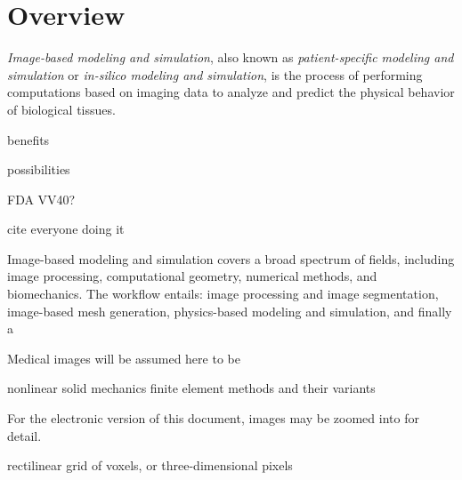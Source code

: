 \chapter{Overview}
%

\textit{Image-based modeling and simulation}, also known as \textit{patient-specific modeling and simulation} or \textit{in-silico modeling and simulation}, is the process of performing computations based on imaging data to analyze and predict the physical behavior of biological tissues.

benefits

possibilities

FDA
VV40?

cite everyone doing it

Image-based modeling and simulation covers a broad spectrum of fields, including image processing, computational geometry, numerical methods, and biomechanics. The workflow entails: image processing and image segmentation, image-based mesh generation, physics-based modeling and simulation, and finally a 

Medical images will be assumed here to be 

nonlinear solid mechanics
finite element methods and their variants

For the electronic version of this document, images may be zoomed into for detail.

rectilinear grid of voxels, or three-dimensional pixels